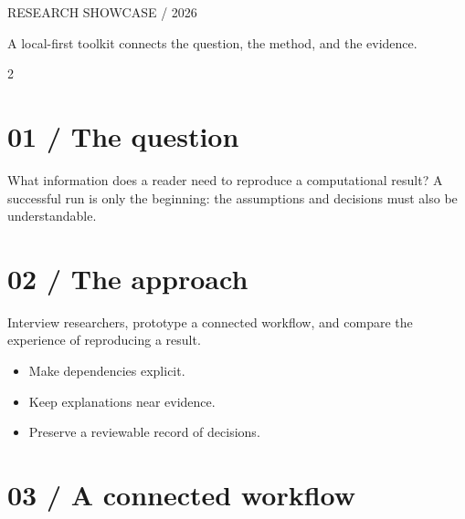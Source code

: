 \documentclass[20pt]{extarticle}
\begin{document}
{\sffamily\color{accent}RESEARCH SHOWCASE / 2026\par}
\vspace{8mm}{\Large Alex Morgan and Jordan Lee / Example University\par}
\vspace{12mm}{\color{ink}\rule{\linewidth}{3pt}}\vspace{10mm}
{\Large A local-first toolkit connects the question, the method, and the evidence.\par}\vspace{12mm}
\begin{multicols}{2}
\section*{01 / The question}What information does a reader need to reproduce a computational result? A successful run is only the beginning: the assumptions and decisions must also be understandable.
\section*{02 / The approach}Interview researchers, prototype a connected workflow, and compare the experience of reproducing a result.
\begin{itemize}\item Make dependencies explicit.\item Keep explanations near evidence.\item Preserve a reviewable record of decisions.\end{itemize}
\section*{03 / A connected workflow}
\begin{center}\end{center}
\columnbreak

\end{multicols}
\end{document}
